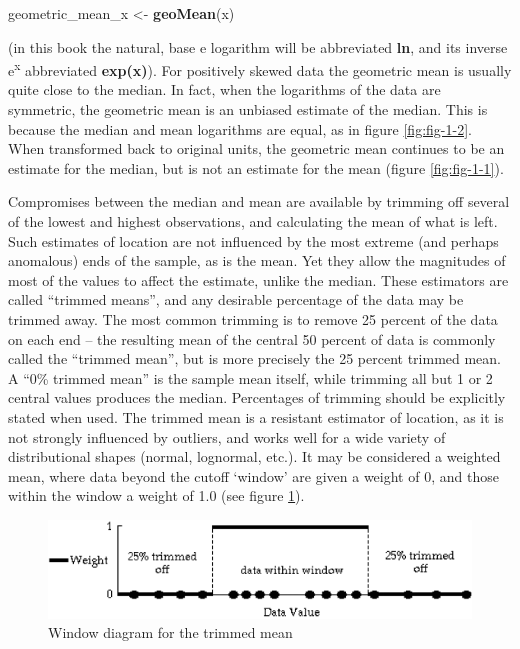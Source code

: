 \documentclass[]{book}
\newenvironment{Shaded}{\begin{snugshade}}{\end{snugshade}}
\newcommand{\KeywordTok}[1]{\textcolor[rgb]{0.13,0.29,0.53}{\textbf{#1}}}
\newcommand{\NormalTok}[1]{#1}
\newcommand{\StringTok}[1]{\textcolor[rgb]{0.31,0.60,0.02}{#1}}
\begin{document}
\begin{Shaded}
\begin{Highlighting}[]
\NormalTok{geometric_mean_x <-}\StringTok{ }\KeywordTok{geoMean}\NormalTok{(x)}
\end{Highlighting}
\end{Shaded}

(in this book the natural, base e logarithm will be abbreviated \textbf{ln}, and its inverse e\textsuperscript{x} abbreviated \textbf{exp(x)}). For positively skewed data the geometric mean is usually quite close to the median. In fact, when the logarithms of the data are symmetric, the geometric mean is an unbiased estimate of the median. This is because the median and mean logarithms are equal, as in figure \ref{fig:fig-1-2}. When transformed back to original units, the geometric mean continues to be an estimate for the median, but is not an estimate for the mean (figure \ref{fig:fig-1-1}).

Compromises between the median and mean are available by trimming off several of the lowest and highest observations, and calculating the mean of what is left. Such estimates of location are not influenced by the most extreme (and perhaps anomalous) ends of the sample, as is the mean. Yet they allow the magnitudes of most of the values to affect the estimate, unlike the median. These estimators are called ``trimmed means'', and any desirable percentage of the data may be trimmed away. The most common trimming is to remove 25 percent of the data on each end -- the resulting mean of the central 50 percent of data is commonly called the ``trimmed mean'', but is more precisely the 25 percent trimmed mean. A ``0\% trimmed mean'' is the sample mean itself, while trimming all but 1 or 2 central values produces the median. Percentages of trimming should be explicitly stated when used. The trimmed mean is a resistant estimator of location, as it is not strongly influenced by outliers, and works well for a wide variety of distributional shapes (normal, lognormal, etc.). It may be considered a weighted mean, where data beyond the cutoff `window' are given a weight of 0, and those within the window a weight of 1.0 (see figure \ref{fig:fig-1-4}).

\begin{figure}

{\centering \includegraphics[width=7.75in]{figures/1_4} 

}

\caption{Window diagram for the trimmed mean}\label{fig:fig-1-4}
\end{figure}
\end{document}
